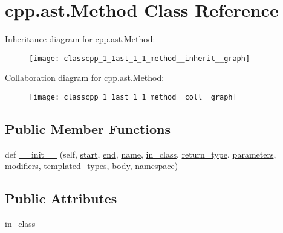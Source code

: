 \hypertarget{classcpp_1_1ast_1_1_method}{}\section{cpp.\+ast.\+Method Class Reference}
\label{classcpp_1_1ast_1_1_method}


Inheritance diagram for cpp.\+ast.\+Method\+:
\nopagebreak
\begin{figure}[H]
\begin{center}
\leavevmode
\texttt{[image: classcpp\_1\_1ast\_1\_1\_method\_\_inherit\_\_graph]}
\end{center}
\end{figure}


Collaboration diagram for cpp.\+ast.\+Method\+:
\nopagebreak
\begin{figure}[H]
\begin{center}
\leavevmode
\texttt{[image: classcpp\_1\_1ast\_1\_1\_method\_\_coll\_\_graph]}
\end{center}
\end{figure}
\subsection*{Public Member Functions}
\begin{DoxyCompactItemize}
\item 
def \hyperlink{classcpp_1_1ast_1_1_method_aa3cbdc9c4b7e92b15fa6acea0dbf2322}{\+\_\+\+\_\+init\+\_\+\+\_\+} (self, \hyperlink{classcpp_1_1ast_1_1_node_a7b2aa97e6a049bb1a93aea48c48f1f44}{start}, \hyperlink{classcpp_1_1ast_1_1_node_a3c5e5246ccf619df28eca02e29d69647}{end}, \hyperlink{classcpp_1_1ast_1_1___generic_declaration_af774f4729dfd78d0538a6782fe8514c1}{name}, \hyperlink{classcpp_1_1ast_1_1_method_aa67244c3673afed43398b5d3e3fa6c1c}{in\+\_\+class}, \hyperlink{classcpp_1_1ast_1_1_function_af750fd788d7ab33163ee066534780212}{return\+\_\+type}, \hyperlink{classcpp_1_1ast_1_1_function_a0e61ef47af9cf2fd4402dbd8cab631ef}{parameters}, \hyperlink{classcpp_1_1ast_1_1_function_ad30eed435f1ff9ff34ade9cc0d7be121}{modifiers}, \hyperlink{classcpp_1_1ast_1_1_function_a57bb03218bade3240137a0d91c467cb6}{templated\+\_\+types}, \hyperlink{classcpp_1_1ast_1_1_function_a8e25e5016b23b38e32acf2df529c0650}{body}, \hyperlink{classcpp_1_1ast_1_1___generic_declaration_a8aee3f11b37449d54b42a78e0a689f46}{namespace})
\end{DoxyCompactItemize}
\subsection*{Public Attributes}
\begin{DoxyCompactItemize}
\item 
\hyperlink{classcpp_1_1ast_1_1_method_aa67244c3673afed43398b5d3e3fa6c1c}{in\+\_\+class}
\end{DoxyCompactItemize}


